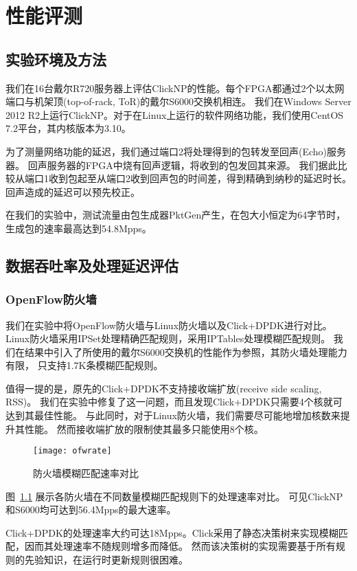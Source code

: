 \chapter{性能评测}
\section{实验环境及方法}
我们在16台戴尔R720服务器上评估ClickNP的性能。每个FPGA都通过2个以太网端口与机架顶(top-of-rack, ToR)的戴尔S6000交换机相连。
我们在Windows Server 2012 R2上运行ClickNP。对于在Linux上运行的软件网络功能，我们使用CentOS 7.2平台，其内核版本为3.10。

为了测量网络功能的延迟，我们通过端口2将处理得到的包转发至回声(Echo)服务器。
回声服务器的FPGA中烧有回声逻辑，将收到的包发回其来源。
我们据此比较从端口1收到包起至从端口2收到回声包的时间差，得到精确到纳秒的延迟时长。
回声造成的延迟可以预先校正。

在我们的实验中，测试流量由包生成器PktGen产生，在包大小恒定为64字节时，
生成包的速率最高达到54.8Mpps。

\section{数据吞吐率及处理延迟评估}
\subsection{OpenFlow防火墙}
我们在实验中将OpenFlow防火墙与Linux防火墙以及Click+DPDK进行对比。
Linux防火墙采用IPSet处理精确匹配规则，采用IPTables处理模糊匹配规则。
我们在结果中引入了所使用的戴尔S6000交换机的性能作为参照，其防火墙处理能力有限，
只支持1.7K条模糊匹配规则。

值得一提的是，原先的Click+DPDK不支持接收端扩放(receive side scaling, RSS)。
我们在实验中修复了这一问题，而且发现Click+DPDK只需要4个核就可达到其最佳性能。
与此同时，对于Linux防火墙，我们需要尽可能地增加核数来提升其性能。
然而接收端扩放的限制使其最多只能使用8个核。

\begin{figure}[htbp]
\centering
\texttt{[image: ofwrate]}
\caption{防火墙模糊匹配速率对比} \label{fig:ofwrate}
\end{figure}
图~\ref{fig:ofwrate} 展示各防火墙在不同数量模糊匹配规则下的处理速率对比。
可见ClickNP和S6000均可达到56.4Mpps的最大速率。

Click+DPDK的处理速率大约可达18Mpps。Click采用了静态决策树来实现模糊匹配，因而其处理速率不随规则增多而降低。
然而该决策树的实现需要基于所有规则的先验知识，在运行时更新规则很困难。


